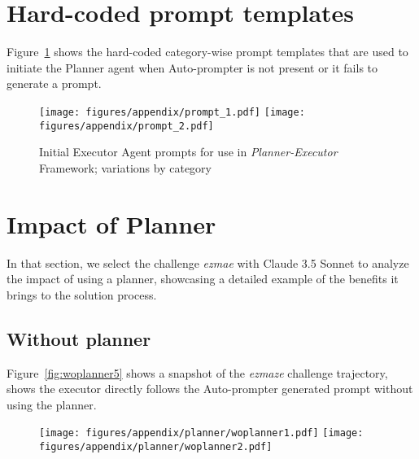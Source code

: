 \clearpage
\newpage

\section{Hard-coded prompt templates}
\label{sec:hard_coded_prompts}
Figure~\ref{fig:planner_conv1} shows the hard-coded category-wise prompt templates that are used to initiate the Planner agent when Auto-prompter is not present or it fails to generate a prompt.

\begin{figure}[H]
    \centering
    \texttt{[image: figures/appendix/prompt\_1.pdf]}
    \texttt{[image: figures/appendix/prompt\_2.pdf]}
    \caption{Initial Executor Agent prompts for use in \textit{Planner-Executor} Framework; variations by category}
    \label{fig:planner_conv1}
\end{figure}

\newpage
\section{Impact of Planner}
\label{sec:impact_planner}
In that section, we select the challenge \textit{ezmae} with Claude 3.5 Sonnet to analyze the impact of using a planner, showcasing a detailed example of the benefits it brings to the solution process.

\subsection{Without planner}
Figure~\ref{fig:woplanner5} shows a snapshot of the \textit{ezmaze} challenge trajectory, shows the executor directly follows the Auto-prompter generated prompt without using the planner.
\begin{figure}[H]
    \centering
    \texttt{[image: figures/appendix/planner/woplanner1.pdf]}
    \texttt{[image: figures/appendix/planner/woplanner2.pdf]}
    \label{fig:woplanner1}
\end{figure}


